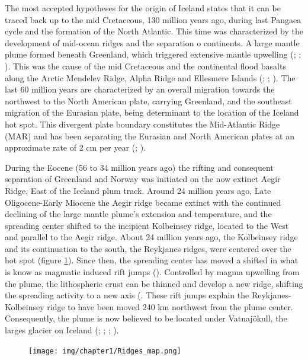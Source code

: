 The most accepted hypotheses for the origin of Iceland states that it can be traced back up to the mid Cretaceous, 130 million years ago, during last Pangaea cycle and the formation of the North Atlantic. This time was characterized by the development of mid-ocean ridges and the separation o continents. A large mantle plume formed beneath Greenland, which triggered extensive mantle upwelling (\cite{wolfe1997}; \cite{holbrook2001}; \cite{rickers2013}). This was the cause of the mid Cretaceous and the continental flood basalts along the Arctic Mendelev Ridge, Alpha Ridge and Ellesmere Islands (\cite{lawver1994}; \cite{johnston2000}; \cite{sigmundsson2006}). The last 60 million years are characterized by an overall migration towards the northwest to the North American plate, carrying Greenland, and the southeast migration of the Eurasian plate, being determinant to the location of the Iceland hot spot. This divergent plate boundary constitutes the Mid-Atlantic Ridge (MAR) and has been separating the Eurasian and North American plates at an approximate rate of 2 cm per year (\cite{sella2002}; \cite{geirsson2006}).

During the Eocene (56 to 34 million years ago) the rifting and consequent separation of Greenland and Norway was initiated on the now extinct Aegir Ridge, East of the Iceland plum track. Around 24 million years ago, Late Oligocene-Early Miocene the Aegir ridge became extinct with the continued declining of the large mantle plume's extension and temperature, and the spreading center shifted to the incipient Kolbeinsey ridge, located to the West and parallel to the Aegir ridge. About 24 million years ago, the Kolbeinsey ridge and its continuation to the south, the Reykjanes ridges, were centered over the hot spot (figure \ref{fig:NA_map}). Since then, the spreading center has moved a shifted in what is know as magmatic induced rift jumps (\cite{hjartarson2017}). Controlled by magma upwelling from the plume, the lithospheric crust can be thinned and develop a new ridge, shifting the spreading activity to a new axis (\cite{mittelstaedt2008}. These rift jumps explain the Reykjanes-Kolbeinsey ridge to have been moved 240 km northwest from the plume center. Consequently, the plume is now believed to be located under Vatnajökull, the larges glacier on Iceland (\cite{einarsson1991}; \cite{einarsson2001} \cite{holbrook2001}; \cite{sigmundsson2006}; \cite{foulger2006}).

\begin{figure}
    \centering
    \texttt{[image: img/chapter1/Ridges\_map.png]}
    \caption{\cite{fitton1997}}
    \label{fig:NA_map}
\end{figure}

